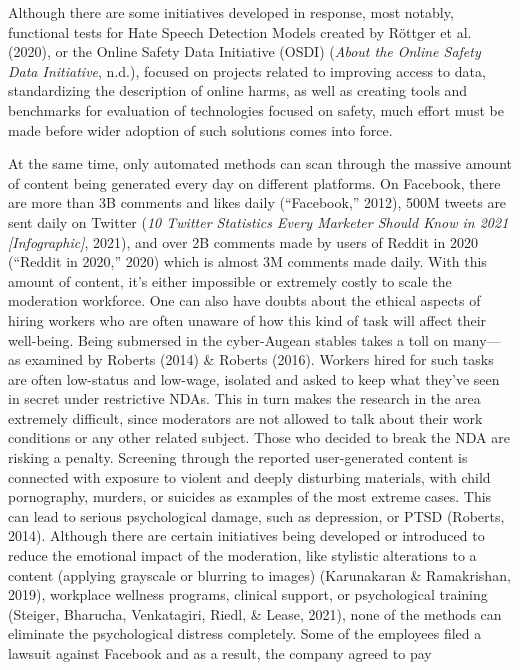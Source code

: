 \documentclass[
  10pt,
  dvipsnames,enabledeprecatedfontcommands]{scrartcl}
\begin{document}
Although there are some initiatives developed in response, most notably,
functional tests for Hate Speech Detection Models created by Röttger et
al. (2020), or the Online Safety Data Initiative (OSDI) (\emph{About the
Online Safety Data Initiative}, n.d.), focused on projects related to
improving access to data, standardizing the description of online harms,
as well as creating tools and benchmarks for evaluation of technologies
focused on safety, much effort must be made before wider adoption of
such solutions comes into force.

At the same time, only automated methods can scan through the massive
amount of content being generated every day on different platforms. On
Facebook, there are more than 3B comments and likes daily
({``Facebook,''} 2012), 500M tweets are sent daily on Twitter (\emph{10
{Twitter} {Statistics} {Every} {Marketer} {Should} {Know} in 2021
{[}{Infographic}{]}}, 2021), and over 2B comments made by users of
Reddit in 2020 ({``Reddit in 2020,''} 2020) which is almost 3M comments
made daily. With this amount of content, it's either impossible or
extremely costly to scale the moderation workforce. One can also have
doubts about the ethical aspects of hiring workers who are often unaware
of how this kind of task will affect their well-being. Being submersed
in the cyber-Augean stables takes a toll on many---as examined by
Roberts (2014) \& Roberts (2016). Workers hired for such tasks are often
low-status and low-wage, isolated and asked to keep what they've seen in
secret under restrictive NDAs. This in turn makes the research in the
area extremely difficult, since moderators are not allowed to talk about
their work conditions or any other related subject. Those who decided to
break the NDA are risking a penalty. Screening through the reported
user-generated content is connected with exposure to violent and deeply
disturbing materials, with child pornography, murders, or suicides as
examples of the most extreme cases. This can lead to serious
psychological damage, such as depression, or PTSD (Roberts, 2014).
Although there are certain initiatives being developed or introduced to
reduce the emotional impact of the moderation, like stylistic
alterations to a content (applying grayscale or blurring to images)
(Karunakaran \& Ramakrishan, 2019), workplace wellness programs,
clinical support, or psychological training (Steiger, Bharucha,
Venkatagiri, Riedl, \& Lease, 2021), none of the methods can eliminate
the psychological distress completely. Some of the employees filed a
lawsuit against Facebook and as a result, the company agreed to pay
\end{document}
